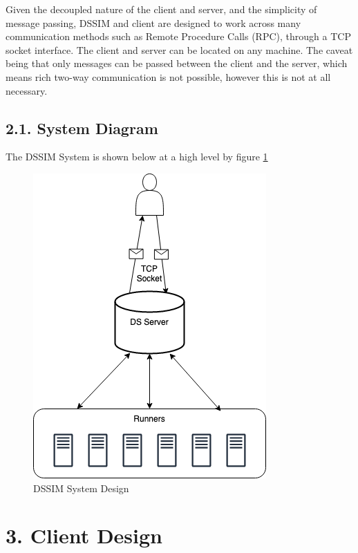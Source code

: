 \documentclass[a4paper]{article} %
\begin{document}
Given the decoupled nature of the client and server, and the simplicity of message passing, DSSIM and client are designed to work across many communication methods such as Remote Procedure Calls (RPC), through a TCP socket interface. The client and server can be located on any machine. The caveat being that only messages can be passed between the client and the server, which means rich two-way communication is not possible, however this is not at all necessary.
\newline
\subsection*{2.1. System Diagram}
The DSSIM System is shown below at a high level by figure \ref{DSSIM}
\begin{figure}[H]
    \centering
    \includegraphics[scale=0.6]{images/DSServer.png}
    \caption{DSSIM System Design}
    \label{DSSIM}
\end{figure}


\section*{3. Client Design}
\end{document}

